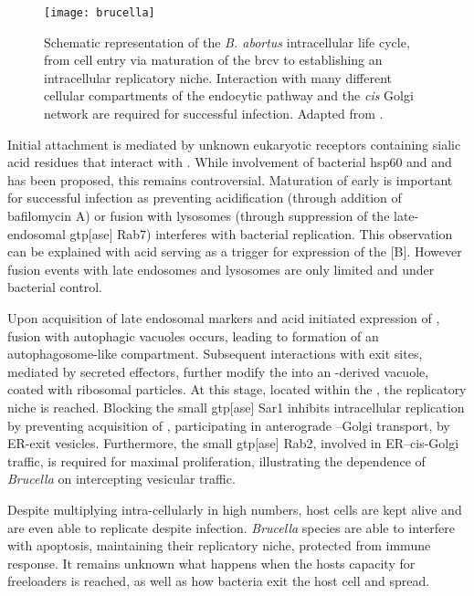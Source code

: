 \begin{figure}
  \centering
  \texttt{[image: brucella]}
  \caption[Schematic representation of the \textit{B. abortus} intracellular life cycle.]{Schematic representation of the \textit{B. abortus} intracellular life cycle, from cell entry via maturation of the \acrlong{brcv} to establishing an intracellular replicatory niche. Interaction with many different cellular compartments of the endocytic pathway and the \textit{cis} Golgi network are required for successful infection. Adapted from \citet{VonBargen2012}.}
  \label{fig:brucella}
\end{figure}

Initial attachment is mediated by unknown eukaryotic receptors containing sialic acid residues that interact with . While involvement of bacterial \acrshort{hsp}60 and and  has been proposed, this remains controversial. Maturation of early  is important for successful infection as preventing acidification (through addition of bafilomycin A) or fusion with lysosomes (through suppression of the late-endosomal \acrshort{gtp}[ase] Rab7) interferes with bacterial replication. This observation can be explained with acid serving as a trigger for expression of the  [B]. However fusion events with late endosomes and lysosomes are only limited and under bacterial control.

Upon acquisition of late endosomal markers and acid initiated expression of , fusion with autophagic vacuoles occurs, leading to formation of an autophagosome-like compartment. Subsequent interactions with  exit sites, mediated by secreted effectors, further modify the  into an -derived vacuole, coated with ribosomal particles. At this stage, located within the , the replicatory niche is reached. Blocking the small \acrshort{gtp}[ase] Sar1 inhibits intracellular replication by preventing acquisition of , participating in anterograde --Golgi transport, by ER-exit vesicles. Furthermore, the small \acrshort{gtp}[ase] Rab2, involved in ER--cis-Golgi traffic, is required for maximal proliferation, illustrating the dependence of \textit{Brucella} on intercepting vesicular traffic.

Despite multiplying intra-cellularly in high numbers, host cells are kept alive and are even able to replicate despite infection. \textit{Brucella} species are able to interfere with apoptosis, maintaining their replicatory niche, protected from immune response. It remains unknown what happens when the hosts capacity for freeloaders is reached, as well as how bacteria exit the host cell and spread.

